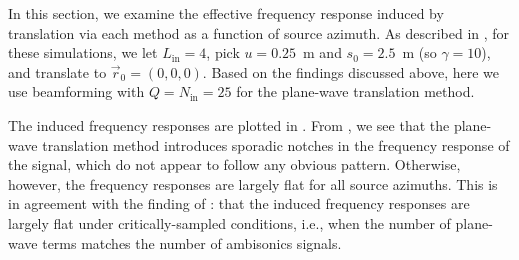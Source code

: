 In this section, we examine the effective frequency response induced by translation via each method as a function of source azimuth.
As described in , for these simulations, we let $L_\text{in} = 4$, pick $u = 0.25$~m and $s_0 = 2.5$~m (so $\gamma = 10$), and translate to $\vec{r}_0 = (0, 0, 0)$.
Based on the findings discussed above, here we use beamforming with $Q = N_\text{in} = 25$ for the plane-wave translation method.

The induced frequency responses are plotted in .
From , we see that the plane-wave translation method introduces sporadic notches in the frequency response of the signal, which do not appear to follow any obvious pattern.
Otherwise, however, the frequency responses are largely flat for all source azimuths.
This is in agreement with the finding of \citet[cf.~Figs.~7c and 7f]{HahnSpors2015b}: that the induced frequency responses are largely flat under critically-sampled conditions, i.e., when the number of plane-wave terms matches the number of ambisonics signals.

